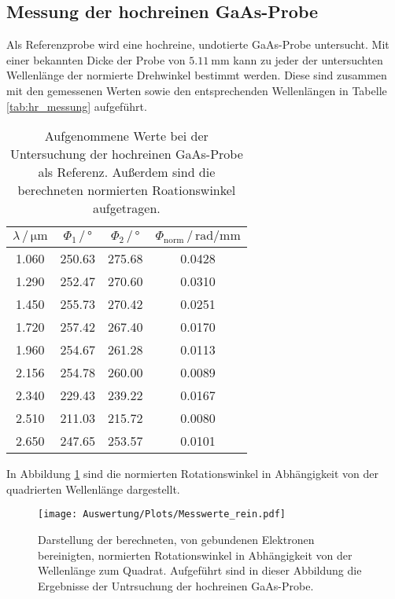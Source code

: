  \subsection{Messung der hochreinen GaAs-Probe}
 Als Referenzprobe wird eine hochreine, undotierte GaAs-Probe untersucht.
 Mit einer bekannten Dicke der Probe von $\SI{5.11}{\milli\meter}$ kann zu jeder der untersuchten
 Wellenlänge der normierte Drehwinkel bestimmt werden. Diese sind zusammen mit den gemessenen Werten sowie den
 entsprechenden Wellenlängen in Tabelle \ref{tab:hr_messung} aufgeführt.
 \begin{table}[H]
    \centering
    \caption{Aufgenommene Werte bei der Untersuchung der hochreinen GaAs-Probe als Referenz. Außerdem sind die
    berechneten normierten Roationswinkel aufgetragen.}
    \label{tab:MF_Messung}
    \begin{tabular}{cccc}
      \toprule
      $\lambda\, / \, \si{\micro\meter}$ & $\Phi_1 \, / \, \si{\degree}$ & $\Phi_2 \, / \, \si{\degree}$ & $\Phi_\text{norm} \, / \, \si{\radian\per\milli\meter}$  \\
      \midrule
      \num{1.060} & \num{250.63} & \num{275.68} & \num{0.0428}  \\
      \num{1.290} & \num{252.47} & \num{270.60} & \num{0.0310}  \\
      \num{1.450} & \num{255.73} & \num{270.42} & \num{0.0251}  \\
      \num{1.720} & \num{257.42} & \num{267.40} & \num{0.0170}  \\
      \num{1.960} & \num{254.67} & \num{261.28} & \num{0.0113}  \\
      \num{2.156} & \num{254.78} & \num{260.00} & \num{0.0089}  \\
      \num{2.340} & \num{229.43} & \num{239.22} & \num{0.0167}  \\
      \num{2.510} & \num{211.03} & \num{215.72} & \num{0.0080}  \\
      \num{2.650} & \num{247.65} & \num{253.57} & \num{0.0101}  \\
      \bottomrule
    \end{tabular}
   \end{table} \noindent
   In Abbildung \ref{fig:hr_Messung} sind die normierten Rotationswinkel in Abhängigkeit von der quadrierten
   Wellenlänge dargestellt.
   \begin{figure}[H]
       \centering
       \texttt{[image: Auswertung/Plots/Messwerte\_rein.pdf]}
       \caption{Darstellung der berechneten, von gebundenen Elektronen bereinigten, normierten Rotationswinkel in Abhängigkeit von der Wellenlänge
       zum Quadrat. Aufgeführt sind in dieser Abbildung die Ergebnisse der Untrsuchung der hochreinen GaAs-Probe. }
       \label{fig:hr_Messung}
   \end{figure}

